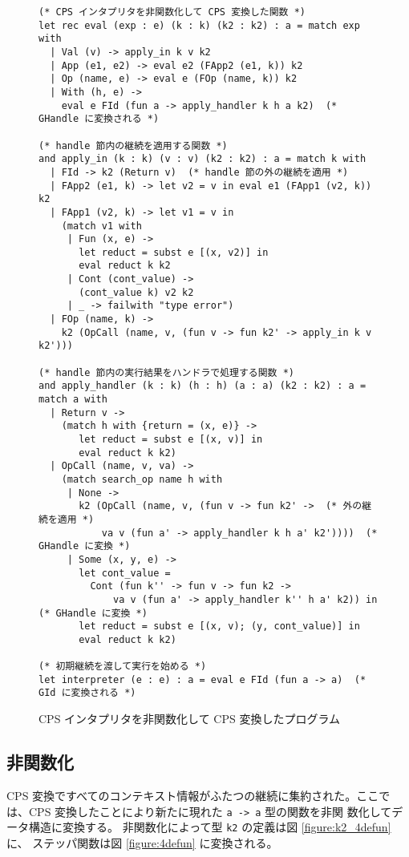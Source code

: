 \begin{figure}
\begin{verbatim}
(* CPS インタプリタを非関数化して CPS 変換した関数 *)
let rec eval (exp : e) (k : k) (k2 : k2) : a = match exp with
  | Val (v) -> apply_in k v k2
  | App (e1, e2) -> eval e2 (FApp2 (e1, k)) k2
  | Op (name, e) -> eval e (FOp (name, k)) k2
  | With (h, e) ->
    eval e FId (fun a -> apply_handler k h a k2)  (* GHandle に変換される *)

(* handle 節内の継続を適用する関数 *)
and apply_in (k : k) (v : v) (k2 : k2) : a = match k with
  | FId -> k2 (Return v)  (* handle 節の外の継続を適用 *)
  | FApp2 (e1, k) -> let v2 = v in eval e1 (FApp1 (v2, k)) k2
  | FApp1 (v2, k) -> let v1 = v in
    (match v1 with
     | Fun (x, e) ->
       let reduct = subst e [(x, v2)] in
       eval reduct k k2
     | Cont (cont_value) ->
       (cont_value k) v2 k2
     | _ -> failwith "type error")
  | FOp (name, k) ->
    k2 (OpCall (name, v, (fun v -> fun k2' -> apply_in k v k2')))

(* handle 節内の実行結果をハンドラで処理する関数 *)
and apply_handler (k : k) (h : h) (a : a) (k2 : k2) : a = match a with
  | Return v ->
    (match h with {return = (x, e)} ->
       let reduct = subst e [(x, v)] in
       eval reduct k k2)
  | OpCall (name, v, va) ->
    (match search_op name h with
     | None ->
       k2 (OpCall (name, v, (fun v -> fun k2' ->  (* 外の継続を適用 *)
           va v (fun a' -> apply_handler k h a' k2'))))  (* GHandle に変換 *)
     | Some (x, y, e) ->
       let cont_value =
         Cont (fun k'' -> fun v -> fun k2 ->
             va v (fun a' -> apply_handler k'' h a' k2)) in  (* GHandle に変換 *)
       let reduct = subst e [(x, v); (y, cont_value)] in
       eval reduct k k2)

(* 初期継続を渡して実行を始める *)
let interpreter (e : e) : a = eval e FId (fun a -> a)  (* GId に変換される *)
\end{verbatim}
\caption{CPS インタプリタを非関数化して CPS 変換したプログラム}
\label{figure:3cps}
\end{figure}

\subsection{非関数化}
\label{subsection:4defun}

CPS 変換ですべてのコンテキスト情報がふたつの継続に集約された。ここで
は、CPS 変換したことにより新たに現れた \texttt{a -> a} 型の関数を非関
数化してデータ構造に変換する。
非関数化によって型 \texttt{k2} の定義は図 \ref{figure:k2_4defun} に、
ステッパ関数は図 \ref{figure:4defun} に変換される。

